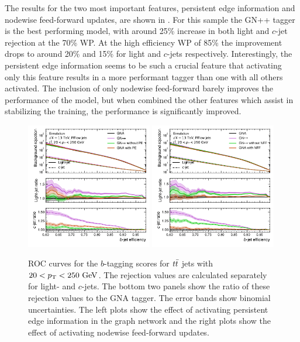 The results for the two most important features, persistent edge information and nodewise feed-forward updates, are shown in .
For this sample the GN++ tagger is the best performing model, with around 25\% increase in both light and $c$-jet rejection at the 70\% WP.
At the high efficiency WP of 85\% the improvement drops to around 20\% and 15\% for light and $c$-jets respectively.
Interestingly, the persistent edge information seems to be such a crucial feature that activating only this feature results in a more performant tagger than one with all others activated.
The inclusion of only nodewise feed-forward barely improves the performance of the model, but when combined the other features which assist in stabilizing the training, the performance is significantly improved.

\begin{figure}[ht]
    \centering
    \includegraphics[width=0.49\textwidth]{figures/flavour_tagging/b_roc_ttbar_edge.pdf}
    \includegraphics[width=0.49\textwidth]{figures/flavour_tagging/b_roc_ttbar_node.pdf}
    \caption{ROC curves for the $b$-tagging scores for $t\bar{t}$ jets with $20 < \pt < 250~\GeV$. The rejection values are calculated separately for light- and $c$-jets. The bottom two panels show the ratio of these rejection values to the GNA tagger. The error bands show binomial uncertainties. The left plots show the effect of activating persistent edge information in the graph network and the right plots show the effect of activating nodewise feed-forward updates.}
    \label{fig:ablation}
\end{figure}

